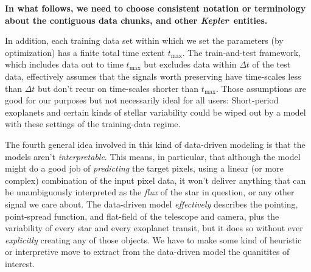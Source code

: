 \documentclass[12pt, preprint]{aastex}
\newcommand{\project}[1]{\textsl{#1}}
\newcommand{\Kepler}{\project{Kepler}}
\newcommand{\todo}[1]{\textbf{#1}}
\begin{document}
\todo{In what follows, we need to choose consistent notation or terminology about the contiguous data chunks, and other \Kepler\ entities.}

In addition, each training data set within which we set the parameters (by optimization) has a finite total time extent $t_{\max}$.
The train-and-test framework, which includes data out to time $t_{\max}$ but excludes data within $\Delta t$ of the test data,
  effectively assumes that the signals worth preserving have time-scales less than $\Delta t$ but don't recur on time-scales
  shorter than $t_{\max}$.
Those assumptions are good for our purposes but not necessarily ideal for all users:
Short-period exoplanets and certain kinds of stellar variability
  could be wiped out by a model with these settings of the training-data regime.

The fourth general idea involved in this kind of data-driven modeling is that the models aren't \emph{interpretable}.
This means, in particular, that although the model might do a good job of \emph{predicting} the target pixels,
  using a linear (or more complex) combination of the input pixel data,
  it won't deliver anything that can be unambiguously interpreted as the \emph{flux} of the star in question,
  or any other signal we care about.
The data-driven model \emph{effectively} describes the pointing, point-spread function, and flat-field
  of the telescope and camera,
  plus the variability of every star and every exoplanet transit,
  but it does so without ever \emph{explicitly} creating any of those objects.
We have to make some kind of heuristic or interpretive move to extract from the data-driven model the quanitites of interest.
\end{document}
